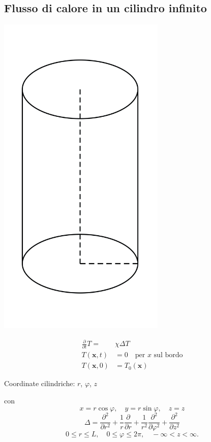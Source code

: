 \documentclass[a4paper,11pt]{report}
\newcommand{\x}{\boldsymbol{x}}
\begin{document}
\subsection{Flusso di calore in un cilindro infinito}

\begin{minipage}{0.3\textwidth}
\centering
\includegraphics[width=0.6\textwidth]{immagini/simm_cil}
\end{minipage}
\begin{minipage}{0.4\textwidth}
\begin{align*}
\frac{\partial}{\partial t}T=&\chi\Delta T \\
T(\x,t)&=0 \quad \text{per $x$ sul bordo}\\
T(\x,0)&=T_0(\x)
\end{align*}
\end{minipage}

Coordinate cilindriche: $r$, $\varphi$, $z$

con
\[
x=r\cos \varphi, \quad y=r\sin \varphi, \quad z=z
\]
\[
\Delta = \frac{\partial ^2}{\partial r^2} +\frac{1}{r}\frac{\partial}{\partial r} +\frac{1}{r^2} \frac{\partial^2}{\partial \varphi ^2} + \frac{\partial ^2}{\partial z^2}
\]
\[
0\leq r \leq L,\quad 0\leq \varphi \leq 2\pi,\quad -\infty <z<\infty.
\]
\end{document}
